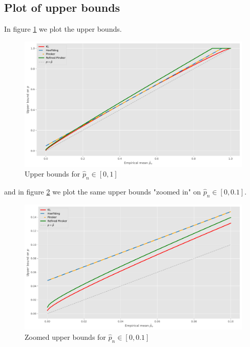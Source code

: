 \subsection*{Plot of upper bounds}
In figure \ref{fig:upper_bounds} we plot the upper bounds. 
\begin{center}
    \begin{figure}[ht]
        \includegraphics[scale=0.53]{figures/upper_bounds.pdf}
        \caption{Upper bounds for $\hat{p}_n \in [0,1]$}
        \label{fig:upper_bounds}
    \end{figure}
\end{center}
and in figure \ref{fig:zoomed_upper_bounds} we plot the same upper bounds "zoomed in" on $\hat{p}_n \in [0,0.1]$.
\begin{center}
    \begin{figure}[ht]
        \includegraphics[scale=0.53]{figures/zoomed_in_upper_bounds.pdf}
        \caption{Zoomed upper bounds for $\hat{p}_n \in [0,0.1]$}
        \label{fig:zoomed_upper_bounds}
    \end{figure}
\end{center}

